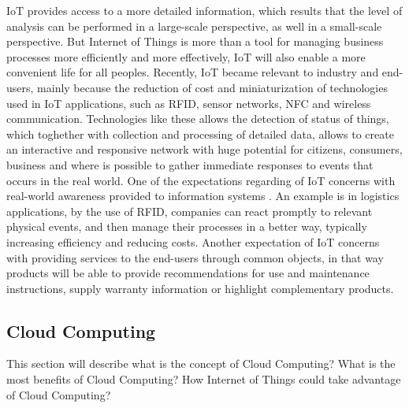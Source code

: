 IoT provides access to a more detailed information, which results that the level of analysis can be performed in a large-scale perspective, as well in a small-scale
perspective. But Internet of Things is more than a tool for managing business processes more efficiently and more effectively, IoT will also enable a more convenient life for all peoples.
Recently, IoT became relevant to industry and end-users\cite{Uckelmann:2011:AIT:2018904}, mainly because the reduction of cost and miniaturization of technologies used in IoT applications, such as RFID, sensor networks, NFC and
wireless communication. Technologies like these allows the detection of status of things, which toghether with collection and processing of detailed data,
allows to create an interactive and responsive network with huge potential for citizens, consumers, business and where is possible to gather immediate responses
to events that occurs in the real world\cite{Uckelmann:2011:AIT:2018904}. One of the expectations regarding of IoT concerns with real-world awareness provided to information systems \cite{mattern2010internet}.
An example is in logistics applications, by the use of RFID, companies can react promptly to relevant physical events, and then manage their processes in a better way,
typically increasing efficiency and reducing costs. Another expectation of IoT concerns with providing services to the end-users through common objects, in that
way products will be able to provide recommendations for use and maintenance instructions, supply warranty information or highlight complementary products.\\
\subsection{Cloud Computing}
\label{sub:Cloud Computing}
This section will describe what is the concept of Cloud Computing? What is the most benefits of Cloud Computing?
How Internet of Things could take advantage of Cloud Computing?\\
